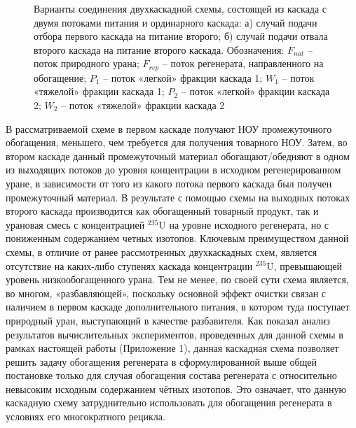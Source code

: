 \begin{figure}[ht]
  \caption{Варианты соединения двухкаскадной схемы, состоящей из каскада с двумя потоками питания и ординарного каскада: а) случай подачи отбора первого каскада на питание второго; б) случай подачи отвала второго каскада на питание второго каскада. Обозначения: $F_{nat}$ -- поток природного урана; $F_{rep}$ -- поток регенерата, направленного на обогащение; $P_1$ -- поток «легкой» фракции каскада 1; $W_1$ – поток «тяжелой» фракции каскада 1; $P_2$ -- поток «легкой» фракции каскада 2; $W_2$ -- поток «тяжелой» фракции каскада 2}\label{f_2double}
\end{figure}


В рассматриваемой схеме в первом каскаде получают НОУ промежуточного обогащения, меньшего, чем требуется для получения товарного НОУ. Затем, во втором каскаде данный промежуточный материал обогащают/обедняют в одном из выходящих потоков до уровня концентрации в исходном регенерированном уране, в зависимости от того из какого потока первого каскада был получен промежуточный материал. В результате с помощью схемы на выходных потоках второго каскада производится как обогащенный товарный продукт, так и урановая смесь с концентрацией $^{235}$U на уровне исходного регенерата, но с пониженным содержанием четных изотопов. Ключевым преимуществом данной схемы, в отличие от ранее рассмотренных двухкаскадных схем, является отсутствие на каких-либо ступенях каскада концентрации $^{235}$U, превышающей уровень низкообогащенного урана.
Тем не менее, по своей сути схема является, во многом, «разбавляющей», поскольку основной эффект очистки связан с наличием в первом каскаде дополнительного питания, в котором туда поступает природный уран, выступающий в качестве разбавителя. Как показал анализ результатов вычислительных экспериментов, проведенных для данной схемы в рамках настоящей работы (Приложение 1), данная каскадная схема позволяет решить задачу обогащения регенерата в сформулированной выше общей постановке только для случая  обогащения состава регенерата с относительно невысоким исходным содержанием чётных изотопов. Это означает, что данную каскадную схему затруднительно использовать для обогащения регенерата в условиях его многократного рецикла.

